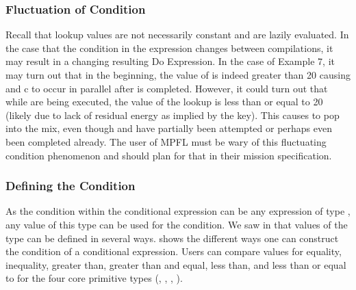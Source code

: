 \subsubsection{Fluctuation of Condition}
Recall that lookup values are not necessarily constant and are lazily evaluated. In the case that the condition in the expression changes between compilations, it may result in a changing resulting Do Expression. In the case of Example 7, it may turn out that in the beginning, the value of  is indeed greater than 20 causing  and {c} to occur in parallel after  is completed. However, it could turn out that while  are being executed, the value of the lookup is less than or equal to 20 (likely due to lack of residual energy as implied by the key). This causes  to pop into the mix, even though  and  have partially been attempted or perhaps even been completed already. The user of MPFL must be wary of this fluctuating condition phenomenon and should plan for that in their mission specification.

\subsubsection{Defining the Condition}
As the condition within the conditional expression can be any expression of type , any value of this type can be used for the condition. We saw in  that values of the  type can be defined in several ways.  shows the different ways one can construct the condition of a conditional expression. Users can compare values for equality, inequality, greater than, greater than and equal, less than, and less than or equal to for the four core primitive types (, , , ).

